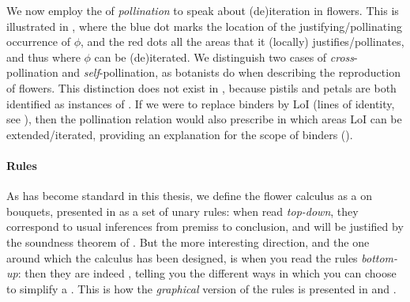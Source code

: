 We now employ the  of \emph{pollination} to speak about (de)iteration in
flowers. This is illustrated in , where the blue dot marks
the location of the justifying/pollinating occurrence of $\phi$, and the red
dots all the areas that it (locally) justifies/pollinates, and thus where $\phi$
can be (de)iterated. We distinguish two cases of
\emph{cross}-pollination and \emph{self}-pollination, as botanists do when
describing the reproduction of flowers. This distinction does not exist in
 , because pistils and petals are both identified as
instances of . If we were to replace
binders by LoI (lines of identity, see ), then the pollination
relation would also prescribe in which areas LoI can be extended/iterated,
providing an explanation for the scope of binders ().

\paragraph{Rules}

As has become standard in this thesis, we define the flower calculus as a
\emph{} on bouquets, presented in  as a
set of unary  rules: when read \emph{top-down}, they correspond to
usual inferences from premiss to conclusion, and will be justified by the
soundness theorem of .
But the more interesting direction, and the one around which the calculus has
been designed, is when you read the rules \emph{bottom-up}: then they are indeed
, telling you the different ways in which you can choose to
simplify a . This is how the \emph{graphical} version of the rules is
presented in  and .

